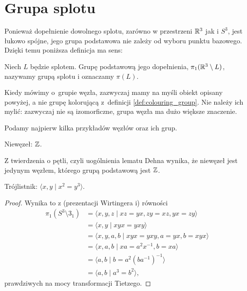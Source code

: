 
\section{Grupa splotu}
Ponieważ dopełnienie dowolnego splotu, zarówno w przestrzeni $\mathbb R^3$ jak i $S^3$, jest łukowo spójne, jego grupa podstawowa nie zależy od wyboru punktu bazowego.
Dzięki temu poniższa definicja ma sens:

\begin{definition}
    Niech $L$ będzie splotem.
    Grupę podstawową jego dopełnienia, $\pi_1(\mathbb R^3 \setminus L)$, nazywamy grupą splotu i oznaczamy $\pi(L)$.
\end{definition}

Kiedy mówimy o~grupie węzła, zazwyczaj mamy na myśli obiekt opisany powyżej, a nie grupę kolorującą z~definicji \ref{def:colouring_group}.
Nie należy ich mylić: zazwyczaj nie są izomorficzne, grupa węzła ma dużo większe znaczenie.

Podamy najpierw kilka przykładów węzłów oraz ich grup.

\begin{example}
    Niewęzeł: $\mathbb Z$.
\end{example}

Z twierdzenia o pętli, czyli uogólnienia lematu Dehna wynika, że niewęzeł jest jedynym węzłem, którego grupą podstawową jest $\mathbb Z$.

\begin{example}
    \label{exm:trefoil_group}
    Trójlistnik: $\langle x, y \mid x^2 = y^3\rangle$.
\end{example}

\begin{proof}
    Wynika to z (prezentacji Wirtingera i) równości
    \begin{align}
        \pi_1(S^3 \setminus 3_1) & = \langle x, y, z \mid xz = yx, zy = xz, yx = zy \rangle \\
                                 & = \langle x, y \mid xyx = yxy \rangle \\
                                 & = \langle x, y, a, b \mid xyx = yxy, a = yx, b = xyx \rangle \\
                                 & = \langle x, a, b \mid xa = a^2x^{-1}, b = xa \rangle \\
                                 & = \langle a, b \mid b = a^2(ba^{-1})^{-1} \rangle \\
                                 & = \langle a, b \mid a^3 = b^2 \rangle,
    \end{align}
    prawdziwych na mocy transformacji Tietzego.
\end{proof}

